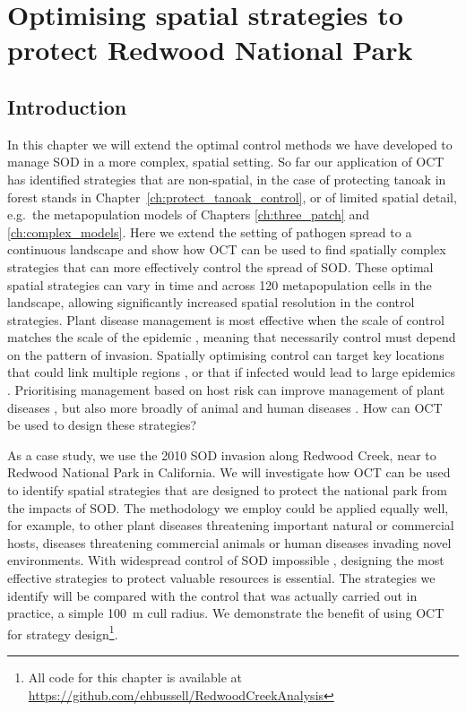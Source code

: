 %

\chapter{Optimising spatial strategies to protect Redwood National Park\label{ch:redwood}}

\section{Introduction}

In this chapter we will extend the optimal control methods we have developed to manage SOD in a more complex, spatial setting. So far our application of OCT has identified strategies that are non-spatial, in the case of protecting tanoak in forest stands in Chapter~\ref{ch:protect_tanoak_control}, or of limited spatial detail, e.g.\ the metapopulation models of Chapters \ref{ch:three_patch} and \ref{ch:complex_models}. Here we extend the setting of pathogen spread to a continuous landscape and show how OCT can be used to find spatially complex strategies that can more effectively control the spread of SOD\@. These optimal spatial strategies can vary in time and across 120 metapopulation cells in the landscape, allowing significantly increased spatial resolution in the control strategies. Plant disease management is most effective when the scale of control matches the scale of the epidemic \citep{gilligan_impact_2007, gilligan_epidemiological_2008, cunniffe_optimising_2015}, meaning that necessarily control must depend on the pattern of invasion. Spatially optimising control can target key locations that could link multiple regions \citep{minor_landscape_2011}, or that if infected would lead to large epidemics \citep{hyatt-twynam_risk-based_2017}. Prioritising management based on host risk can improve management of plant diseases \citep{cunniffe_modelling_2016}, but also more broadly of animal \citep{tildesley_optimal_2006} and human diseases \citep{fraser_factors_2004}. How can OCT be used to design these strategies?

As a case study, we use the 2010 SOD invasion along Redwood Creek, near to Redwood National Park in California. We will investigate how OCT can be used to identify spatial strategies that are designed to protect the national park from the impacts of SOD\@. The methodology we employ could be applied equally well, for example, to other plant diseases threatening important natural or commercial hosts, diseases threatening commercial animals or human diseases invading novel environments. With widespread control of SOD impossible \citep{cunniffe_modelling_2016}, designing the most effective strategies to protect valuable resources is essential. The strategies we identify will be compared with the control that was actually carried out in practice, a simple \SI{100}{\meter} cull radius. We demonstrate the benefit of using OCT for strategy design\footnote{All code for this chapter is available at \url{https://github.com/ehbussell/RedwoodCreekAnalysis} }.

